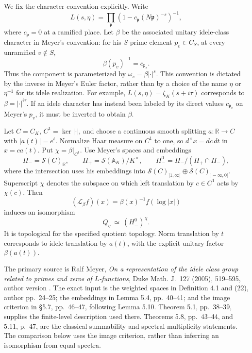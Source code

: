 \documentclass[11pt,a4paper]{article}
\begin{document}
We fix the character convention explicitly.  Write
\[
 L(s,\eta)=\prod_{\mathfrak p}
       (1-c_{\mathfrak p}(N\mathfrak p)^{-s})^{-1},
\]
where \(c_{\mathfrak p}=0\) at a ramified place.  Let
\(\beta\) be the associated unitary idele-class character
in Meyer's convention: for his \(S\)-prime element
\(p_v\in C_S\), at every unramified \(v\notin S\),
\[
                      \beta(p_v)^{-1}=c_{\mathfrak p_v}.
                                                               \tag{M22.1}
\]
Thus the component is parameterized by
\(\omega_s=\beta|\cdot|^s\).
This convention is dictated by the inverse in Meyer's
Euler factor, rather than by a choice of the name
\(\eta\) or \(\eta^{-1}\) for its idele realization.
For example, \(L(s,\eta)=\zeta_K(s+i\tau)\) corresponds
to \(\beta=|\cdot|^{i\tau}\).
If an idele character has instead been labeled by
its direct values \(c_{\mathfrak p_v}\) on Meyer's
\(p_v\), it must be inverted to obtain \(\beta\).

Let \(C=C_K\), \(C^1=\ker|\cdot|\), and choose a
continuous smooth splitting \(a:\mathbb R\to C\)
with \(|a(t)|=e^t\).
Normalize Haar measure on \(C^1\) to one, so
\(d^\times x=dc\,dt\) in \(x=ca(t)\).
Put \(\chi=\beta|_{C^1}\).
Use Meyer's spaces and embeddings
\[
 H_-=\mathcal S(C)_{\mathbb R},\qquad
 H_+=\mathcal S(\mathbb A_K)/K^\times,\qquad
 H_-^0=H_-/(H_+\cap H_-),
\]
where the intersection uses his embeddings into
\(\mathcal S(C)_{]1,\infty[}\oplus
  \mathcal S(C)_{]-\infty,0[}\).
Superscript \(\chi\) denotes the subspace on which
left translation by \(c\in C^1\) acts by \(\chi(c)\).
Then
\[
 (\mathcal L_\beta f)(x)=\beta(x)^{-1}f(\log|x|)
\]
induces an isomorphism
\[
              Q_\eta \ \simeq\ (H_-^0)^\chi.                  \tag{M22.2}
\]
It is topological for the specified quotient topology.
Norm translation by \(t\) corresponds to idele
translation by \(a(t)\), with the explicit unitary
factor \(\beta(a(t))\).

The primary source is Ralf Meyer, \emph{On a representation
of the idele class group related to primes and zeros of
\(L\)-functions}, Duke Math. J.~127 (2005), 519--595,
author version .
The exact input is the weighted spaces in Definition 4.1
and (22), author pp.~24--25; the embeddings in Lemma 5.4,
pp.~40--41; and the image criterion in \S5.7, pp.~46--47,
following Lemma 5.10.  Theorem 5.1, pp.~38--39, supplies
the finite-level description used there.
Theorems 5.8, pp.~43--44, and 5.11, p.~47, are the
classical summability and spectral-multiplicity statements.
The comparison below uses the image criterion,
rather than inferring an isomorphism from equal spectra.
\end{document}
